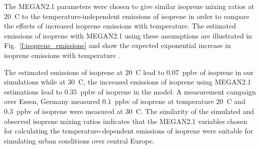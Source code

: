 The MEGAN2.1 parameters were chosen to give similar isoprene mixing ratios at $20$~\degree C to the temperature-independent emissions of isoprene in order to compare the effects of increased isoprene emissions with temperature.
The estimated emissions of isoprene with MEGAN2.1 using these assumptions are illustrated in Fig.~\ref{f:isoprene_emissions} and show the expected exponential increase in isoprene emissions with temperature \citep{Guenther:2006}.

The estimated emissions of isoprene at $20$~\degree C lead to $0.07$~ppbv of isoprene in our simulations while at $30$~\degree C, the increased emissions of isoprene using MEGAN2.1 estimations lead to $0.35$~ppbv of isoprene in the model.
A measurement campaign over Essen, Germany \citep{Wagner:2014} measured $0.1$~ppbv of isoprene at temperature $20$~\degree C and $0.3$~ppbv of isoprene were measured at $30$~\degree C.
The similarity of the simulated and observed isoprene mixing ratios indicates that the MEGAN2.1 variables chosen for calculating the temperature-dependent emissions of isoprene were suitable for simulating urban conditions over central Europe.
